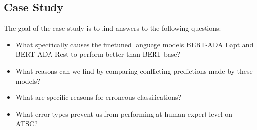 \documentclass[11pt,a4paper]{article}
\newcommand{\rood}[1]{}
\begin{document}
\subsection{Case Study}
\label{sect:Casestudy}


\rood{Outcome: Here Readers should get a feel for how
  the finetuning on different domains and when the model is trained
  cross domain, multidomain and only on its domain.
  Maybe also show a BERT MHA visualization.
  \begin{itemize}
  \item Q1: Which world/word/domain knowledge is needed
    to correctly classify restaurant or laptop reviews?
  \item Q2: Does sentiment word-context confusions occur when mixing datasets
  \item Q3: Which kind of Sentiments are correctly classified with respect to  bert-base - in progress
  \item Q4: Which kind of generalization errors occur in out-of-domain generalization
  \end{itemize}}
  
  
The goal of the case study is to find answers to the following questions:
\begin{itemize}
 \item What specifically causes the finetuned language models BERT-ADA Lapt and BERT-ADA Rest to perform better than BERT-base?
 \item What reasons can we find by comparing conflicting predictions made by these models?
 \item What are specific reasons for erroneous classifications?
 \item What error types prevent us from performing at human expert level on ATSC?
\end{itemize}
\end{document}
